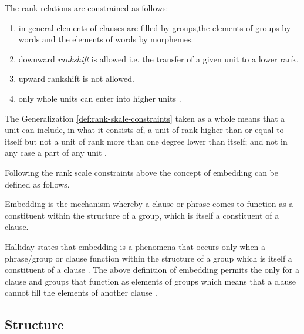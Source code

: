\begin{generalization}\label{def:rank-skale-constraints}
	The rank relations are constrained as follows:
	\begin{enumerate}
        \item in general elements of clauses are filled by groups,the elements of groups by words and the elements of words by morphemes.
		\item downward \textit{rankshift} is allowed i.e. the transfer of a given unit to a lower rank. 
		\item upward rankshift is not allowed.
		\item only whole units can enter into higher units \citep[44]{Halliday2002}.
	\end{enumerate}
\end{generalization}

The Generalization \ref{def:rank-skale-constraints} taken as a whole means that a unit can include, in what it consists of, a unit of rank higher than or equal to itself but not a unit of rank more than one degree lower than itself; and not in any case a part of any unit \citep[42]{Halliday2002}. 

Following the rank scale constraints above the concept of embedding can be defined as follows. 

\begin{definition}[Embedding]\label{def:embedding0}
    Embedding is the mechanism whereby a clause or phrase comes to function as a constituent within the structure of a group, which is itself a constituent of a clause. \citep[242]{Halliday2013}
\end{definition}

Halliday states that embedding is a phenomena that occurs only when a phrase/group or clause function within the structure of a group which is itself a constituent of a clause \citep[242]{ifg2}. The above definition of embedding permits the only for a clause and groups that function as elements of groups which means that a clause cannot fill the elements of another clause \citep[237]{Fawcett2000}.

\subsection{Structure}

